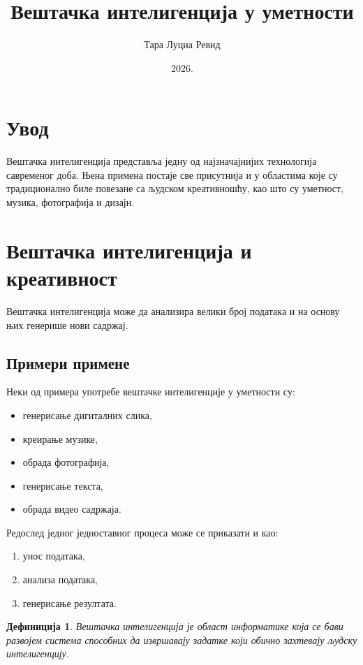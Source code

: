\documentclass[12pt,a4paper]{article}
\title{Вештачка интелигенција у уметности}
\author{Тара Луциа Ревид}
\date{2026.}
\newtheorem{definicija}{Дефиниција}
\begin{document}
\renewcommand{\contentsname}{Садржај}

\maketitle

\tableofcontents

\section{Увод}

Вештачка интелигенција представља једну од најзначајнијих
технологија савременог доба. Њена примена постаје све присутнија
и у областима које су традиционално биле повезане са људском
креативношћу, као што су уметност, музика, фотографија и дизајн.

\section{Вештачка интелигенција и креативност}

Вештачка интелигенција може да анализира велики број података
и на основу њих генерише нови садржај.

\subsection{Примери примене}

Неки од примера употребе вештачке интелигенције у уметности су:

\begin{itemize}
    \item генерисање дигиталних слика,
    \item креирање музике,
    \item обрада фотографија,
    \item генерисање текста,
    \item обрада видео садржаја.
\end{itemize}

Редослед једног једноставног процеса може се приказати и као:

\begin{enumerate}
    \item унос података,
    \item анализа података,
    \item генерисање резултата.
\end{enumerate}

\begin{definicija}
Вештачка интелигенција је област информатике која се бави
развојем система способних да извршавају задатке који обично
захтевају људску интелигенцију.
\end{definicija}
\end{document}
